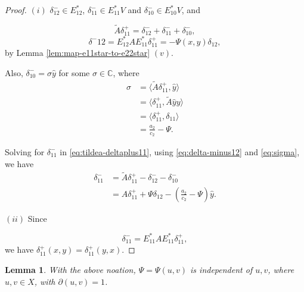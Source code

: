 \documentclass[
]{book}
\newtheorem{lemma}{Lemma}[chapter]
\theoremstyle{definition}
\theoremstyle{definition}
\theoremstyle{definition}
\theoremstyle{definition}
\theoremstyle{remark}
\begin{document}
\begin{proof}
\leavevmode

\((i)\) \(\delta^-_{12}\in E^*_{12}\), \(\delta^-_{11}\in E^*_{11}V\) and \(\delta^-_{10}\in E^*_{10}V\), and

\begin{equation}
\tilde{A}\delta^+_{11} = \delta^-_{12} + \delta^-_{11} + \delta^-_{10}, \label{eq:tildea-deltaplus11}
\end{equation}
\begin{equation}
\delta^-{12} = E^*_{12}AE^*_{11}\delta^+_{11} = -\Psi(x,y)\delta_{12} \label{eq:delta-minus12},
\end{equation}
by Lemma \ref{lem:map-e11star-to-e22star} \((v)\).

Also, \(\delta^-_{10} = \sigma\hat{y}\) for some \(\sigma\in \mathbb{C}\), where
\begin{align}
\sigma & = \langle \tilde{A}\delta^+_{11}, \hat{y}\rangle \\
& = \langle \delta^+_{11}, \tilde{A}\hat{y}y\rangle\\
& = \langle \delta^+_{11}, \delta_{11}\rangle \\
& = \frac{a_2}{c_2}-\Psi. \label{eq:sigma}
\end{align}

Solving for \(\delta^-_{11}\) in \eqref{eq:tildea-deltaplus11}, using \eqref{eq:delta-minus12} and \eqref{eq:sigma}, we have
\begin{align}
\delta^-_{11} & = \tilde{A}\delta^+_{11} - \delta^-_{12} - \delta^-_{10}\\
& = A\delta^+_{11} + \Psi \delta_{12} - \left(\frac{a_2}{c_2} - \Psi\right)\hat{y}.
\end{align}

\((ii)\) Since

\[\delta^-_{11} = E^*_{11}AE^*_{11}\delta^+_{11},\]
we have \(\delta^+_{11}(x,y) = \delta^+_{11}(y,x)\).

\end{proof}

\begin{lemma}
\protect\hypertarget{lem:psi}{}\label{lem:psi}With the above noation, \(\Psi = \Psi(u,v)\) is independent of \(u, v\), where
\(u,v\in X\), with \(\partial(u,v)=1\).
\end{lemma}
\end{document}

